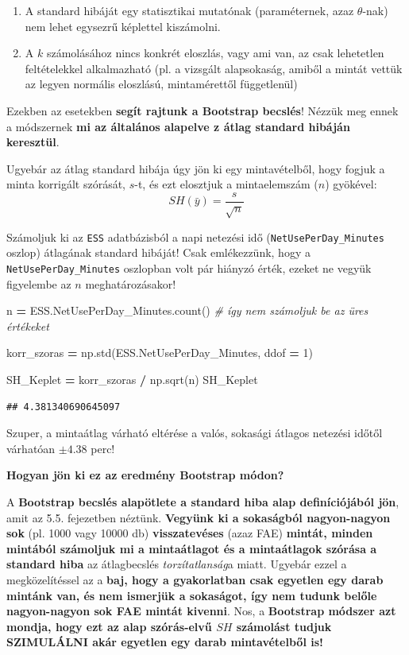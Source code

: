\documentclass[
]{book}
\newenvironment{Shaded}{\begin{snugshade}}{\end{snugshade}}
\newcommand{\CommentTok}[1]{\textcolor[rgb]{0.56,0.35,0.01}{\textit{#1}}}
\newcommand{\DecValTok}[1]{\textcolor[rgb]{0.00,0.00,0.81}{#1}}
\newcommand{\NormalTok}[1]{#1}
\newcommand{\OperatorTok}[1]{\textcolor[rgb]{0.81,0.36,0.00}{\textbf{#1}}}
\providecommand{\tightlist}{%
  \setlength{\itemsep}{0pt}\setlength{\parskip}{0pt}}
\begin{document}
\begin{enumerate}
\def\labelenumi{\arabic{enumi}.}
\tightlist
\item
  A standard hibáját egy statisztikai mutatónak (paraméternek, azaz \(\theta\)-nak) nem lehet egysezrű képlettel kiszámolni.
\item
  A \(k\) számolásához nincs konkrét eloszlás, vagy ami van, az csak lehetetlen feltételekkel alkalmazható (pl. a vizsgált alapsokaság, amiből a mintát vettük az legyen normális eloszlású, mintamérettől függetlenül)
\end{enumerate}

Ezekben az esetekben \textbf{segít rajtunk a Bootstrap becslés}! Nézzük meg ennek a módszernek \textbf{mi az általános alapelve z átlag standard hibáján keresztül}.

Ugyebár az átlag standard hibája úgy jön ki egy mintavételből, hogy fogjuk a minta korrigált szórását, \(s\)-t, és ezt elosztjuk a mintaelemszám (\(n\)) gyökével: \[SH(\bar{y})=\frac{s}{\sqrt{n}}\]

Számoljuk ki az \texttt{ESS} adatbázisból a napi netezési idő (\texttt{NetUsePerDay\_Minutes} oszlop) átlagának standard hibáját! Csak emlékezzünk, hogy a \texttt{NetUsePerDay\_Minutes} oszlopban volt pár hiányzó érték, ezeket ne vegyük figyelembe az \(n\) meghatározásakor!

\begin{Shaded}
\begin{Highlighting}[]
\NormalTok{n }\OperatorTok{=}\NormalTok{ ESS.NetUsePerDay\_Minutes.count() }\CommentTok{\# így nem számoljuk be az üres értékeket}

\NormalTok{korr\_szoras }\OperatorTok{=}\NormalTok{ np.std(ESS.NetUsePerDay\_Minutes, ddof }\OperatorTok{=} \DecValTok{1}\NormalTok{)}

\NormalTok{SH\_Keplet }\OperatorTok{=}\NormalTok{ korr\_szoras }\OperatorTok{/}\NormalTok{ np.sqrt(n)}
\NormalTok{SH\_Keplet}
\end{Highlighting}
\end{Shaded}

\begin{verbatim}
## 4.381340690645097
\end{verbatim}

Szuper, a mintaátlag várható eltérése a valós, sokasági átlagos netezési időtől várhatóan \(\pm4.38\) perc!

\textbf{Hogyan jön ki ez az eredmény Bootstrap módon?}

A \textbf{Bootstrap becslés alapötlete a standard hiba alap definíciójából jön}, amit az 5.5. fejezetben néztünk. \textbf{Vegyünk ki a sokaságból nagyon-nagyon sok} (pl. 1000 vagy 10000 db) \textbf{visszatevéses} (azaz FAE) \textbf{mintát, minden mintából számoljuk mi a mintaátlagot és a mintaátlagok szórása a standard hiba} az átlagbecslés \emph{torzítatlanság}a miatt.
Ugyebár ezzel a megközelítéssel az a \textbf{baj, hogy a gyakorlatban csak egyetlen egy darab mintánk van, és nem ismerjük a sokaságot, így nem tudunk belőle nagyon-nagyon sok FAE mintát kivenni}.
Nos, a \textbf{Bootstrap módszer azt mondja, hogy ezt az alap szórás-elvű \(SH\) számolást tudjuk SZIMULÁLNI akár egyetlen egy darab mintavételből is!}
\end{document}
